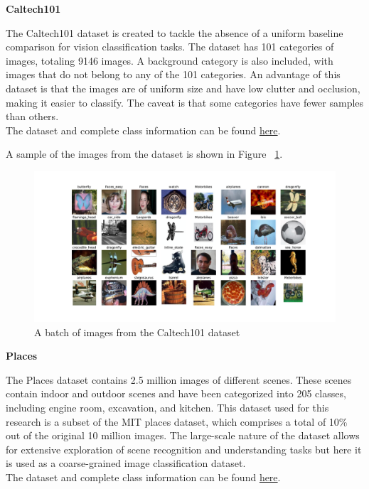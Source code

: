 \documentclass[a4paper,11pt,openright]{book}
\begin{document}
\textbf{Caltech101}

The Caltech101 \cite{liCaltech101} dataset is created to tackle the absence of a uniform baseline comparison for vision classification tasks. The dataset has 101 categories of images, totaling 9146 images. A background category is also included, with images that do not belong to any of the 101 categories. An advantage of this dataset is that the images are of uniform size and have low clutter and occlusion, making it easier to classify. The caveat is that some categories have fewer samples than others.\\
The dataset and complete class information can be found \href{https://www.kaggle.com/datasets/862ae86edba271c39f76d0b530edeb55076b4b82b971160637210900747c44b1}{here}.

A sample of the images from the dataset is shown in Figure ~\ref{fig:calt}.

\begin{figure}[!htb]
    \centering
    \includegraphics[width=1\textwidth]{images/caltech101.pdf}
    \caption{A batch of images from the Caltech101 dataset}
    \label{fig:calt}
\end{figure}

\textbf{Places}

The Places dataset \cite{zhouPlaces10Million2018} contains 2.5 million images of different scenes. These scenes contain indoor and outdoor scenes and have been categorized into 205 classes, including engine room, excavation, and kitchen. This dataset used for this research is a subset of the MIT places dataset, which comprises a total of 10\% out of the original 10 million images. The large-scale nature of the dataset allows for extensive exploration of scene recognition and understanding tasks but here it is used as a coarse-grained image classification dataset.\\
The dataset and complete class information can be found \href{https://www.kaggle.com/datasets/mittalshubham/images256}{here}.
\end{document}
